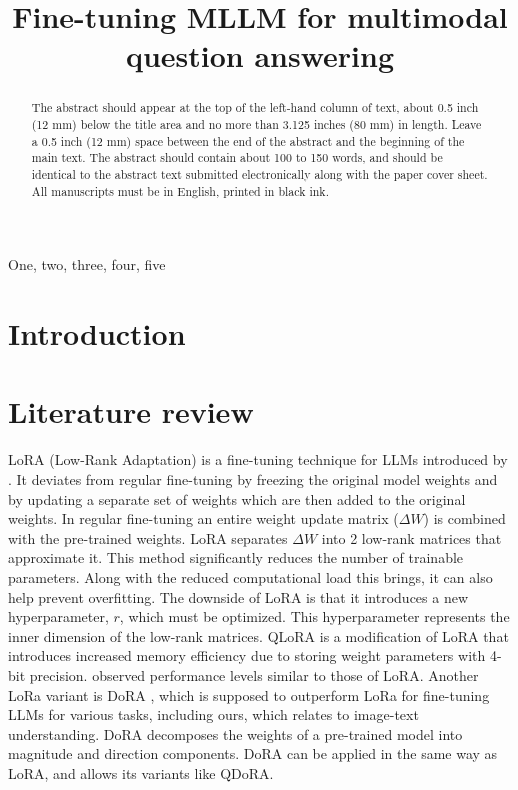 \documentclass{article}
\title{Fine-tuning MLLM for multimodal question answering}
\begin{document}
%
\maketitle
%
\begin{abstract}
The abstract should appear at the top of the left-hand column of text, about
0.5 inch (12 mm) below the title area and no more than 3.125 inches (80 mm) in
length.  Leave a 0.5 inch (12 mm) space between the end of the abstract and the
beginning of the main text.  The abstract should contain about 100 to 150
words, and should be identical to the abstract text submitted electronically
along with the paper cover sheet.  All manuscripts must be in English, printed
in black ink.
\end{abstract}
%
\begin{keywords}
One, two, three, four, five
\end{keywords}
%
\section{Introduction}
\label{sec:intro}


\section{Literature review}
\label{sec:litreview}

LoRA (Low-Rank Adaptation) is a fine-tuning technique for LLMs introduced by \cite{lora}. It
deviates from regular fine-tuning by freezing the original model weights and by updating a
separate set of weights which are then added to the original weights. In regular fine-tuning
an entire weight update matrix ($\Delta W$) is combined with the pre-trained weights. LoRA
separates $\Delta W$ into 2 low-rank matrices that approximate it. This method significantly
reduces the number of trainable parameters. Along with the reduced computational load this
brings, it can also help prevent overfitting. The downside of LoRA is that it introduces
a new hyperparameter, $r$, which must be optimized. This hyperparameter represents the inner
dimension of the low-rank matrices. QLoRA \cite{qlora} is a modification of LoRA that introduces
increased memory efficiency due to storing weight parameters with 4-bit precision. \cite{qlora}
observed performance levels similar to those of LoRA.
Another LoRa variant is DoRA \cite{dora}, which is supposed to outperform LoRa
for fine-tuning LLMs for various tasks, including ours, which relates to image-text
understanding. DoRA decomposes the weights of a pre-trained model into magnitude and direction
components. DoRA can be applied in the same way as LoRA, and allows its variants like QDoRA.
\end{document}
